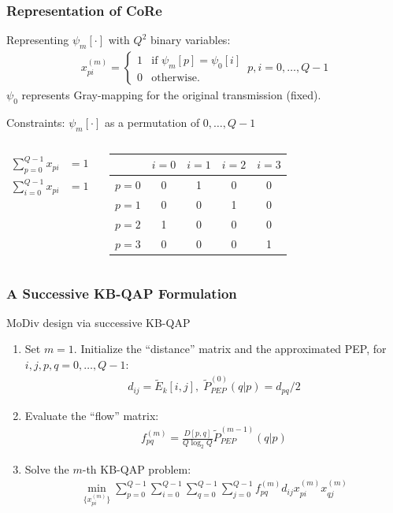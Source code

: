 \documentclass{beamer}
\begin{document}
\begin{frame}
  \frametitle{Representation of CoRe}
  Representing $\psi_m[\cdot]$ with $Q^2$ binary variables:
  \begin{align*}
    x_{pi}^{(m)} = \left\{ \begin{array}{cc}1 & \mbox{if } \psi_m[p] =
    \psi_0[i]\\ 0 & \mbox{otherwise.}\end{array} \right. \,
    p, i = 0,\ldots, Q - 1
  \end{align*}
  $\psi_0$ represents Gray-mapping for the original transmission (fixed).
  \begin{block}{Constraints: $\psi_m[\cdot]$ as a permutation of $0,\ldots, Q -
  1$}
    \begin{columns}
      \begin{align*}
        \sum_{p=0}^{Q-1}x_{pi} & = 1\\
        \sum_{i=0}^{Q-1}x_{pi} & = 1
      \end{align*}
      
      \begin{tabular}{c|cccc}
          \hline
          & $i=0$ & $i=1$ & $i=2$ & $i = 3$\\
          \hline
          $p=0$ & 0 & 1 & 0 & 0 \\
          $p=1$ & 0 & 0 & 1 & 0 \\
          $p=2$ & 1 & 0 & 0 & 0 \\
          $p=3$ & 0 & 0 & 0 & 1 \\
          \hline
      \end{tabular}
    \end{columns}
  \end{block}
\end{frame}

\begin{frame}
  \frametitle{A Successive KB-QAP Formulation}
  \begin{block}{MoDiv design via successive KB-QAP}
    \begin{enumerate}[<+->]
      \item Set $m = 1$. Initialize the ``distance'' matrix and the approximated
      PEP, for $i,j,p,q=0,\ldots,Q-1$:
      \begin{align*}
        d_{ij} = \tilde{E}_k[i,j],\; \tilde{P}_{PEP}^{(0)}(q|p) = d_{pq}/2
      \end{align*}
      \item Evaluate the ``flow'' matrix:
      \begin{align*}
        f_{pq}^{(m)} = \frac{D[p,q]}{Q\log_2Q}\tilde{P}_{PEP}^{(m-1)}(q|p)
      \end{align*}
      \item Solve the $m$-th KB-QAP problem:
      \begin{align*}
        \min_{\{x_{pi}^{(m)}\}}
        \sum_{p=0}^{Q-1}\sum_{i=0}^{Q-1}
        \sum_{q=0}^{Q-1}\sum_{j=0}^{Q-1}
        f_{pq}^{(m)}d_{ij}x_{pi}^{(m)}x_{qj}^{(m)}
      \end{align*}
    \end{enumerate}
  \end{block}
\end{frame}
\end{document}
